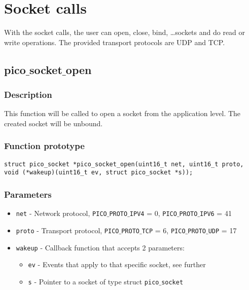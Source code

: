 \section{Socket calls}

With the socket calls, the user can open, close, bind, \ldots sockets and do read
or write operations. The provided transport protocols are UDP and TCP.

\subsection{pico$\_$socket$\_$open}

\subsubsection*{Description}
This function will be called to open a socket from the application level. The created
socket will be unbound.

\subsubsection*{Function prototype}
\begin{verbatim}
struct pico_socket *pico_socket_open(uint16_t net, uint16_t proto,
void (*wakeup)(uint16_t ev, struct pico_socket *s));
\end{verbatim}

\subsubsection*{Parameters}
\begin{itemize}[noitemsep]
\item \texttt{net} - Network protocol, \texttt{PICO$\_$PROTO$\_$IPV4} = 0, \texttt{PICO$\_$PROTO$\_$IPV6} = 41
\item \texttt{proto} - Transport protocol, \texttt{PICO$\_$PROTO$\_$TCP} = 6, \texttt{PICO$\_$PROTO$\_$UDP} = 17
\item \texttt{wakeup} - Callback function that accepts 2 parameters:
\begin{itemize}[noitemsep]
\item \texttt{ev} - Events that apply to that specific socket, see further
\item \texttt{s} - Pointer to a socket of type struct \texttt{pico$\_$socket}
\end{itemize}
\end{itemize}

